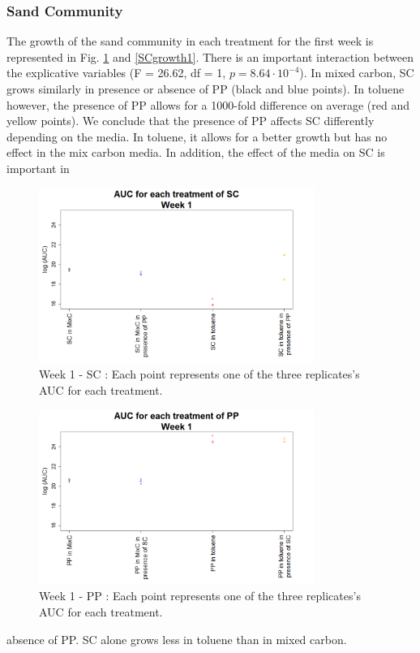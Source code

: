 \documentclass[a4paper, 10pt, conference]{ieeeconf}   %
\begin{document}
\subsubsection{Sand Community}
The growth of the sand community in each treatment for the first week is represented in Fig. \ref{aucscw1} and \ref{SCgrowth1}.
There is an important interaction between the explicative variables (F = 26.62, df = 1, $p = 8.64\cdot 10 ^{-4}$).
In mixed carbon, SC grows similarly in presence or absence of PP (black and blue points).
In toluene however, the presence of PP allows for a 1000-fold difference on average (red and yellow points).
We conclude that the presence of PP affects SC differently depending on the media. In toluene, it allows for a better growth but has no effect in the mix carbon media. In addition, the effect of the media on SC is important in
\begin{figure}[H]
	\centering
	\includegraphics[width=9cm]{AUCsc1.png}
	\caption{Week 1 - SC : Each point represents one of the three replicates's AUC for each treatment.}
	\label{aucscw1}
\end{figure}%
\vspace{-0.4cm}
\begin{figure}[H]
	\centering
	\includegraphics[width=9cm]{AUCpp1.png}
	\caption{Week 1 - PP : Each point represents one of the three replicates's AUC for each treatment.}
	\label{aucppw1}
\end{figure}
absence of PP. SC alone grows less in toluene than in mixed carbon.\newline
\end{document}
